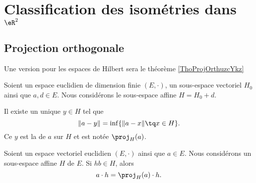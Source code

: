 
\section{Classification des isométries dans \( \eR^2\)}

\subsection{Projection orthogonale}

Une version pour les espaces de Hilbert sera le théorème \ref{ThoProjOrthuzcYkz}
\begin{propositionDef}      \label{DEFooHXJTooNPyDFQ}
    Soient un espace euclidien de dimension finie \( (E,\cdot)\), un sous-espace vectoriel \( H_0\) ainsi que \( a,d\in E\). Nous considérons le sous-espace affine \( H=H_0+d\).

    Il existe un unique \( y\in H\) tel que
    \begin{equation}
        \| a-y  \|=\inf\{ \| a-x \|\tq x\in H \}.
    \end{equation}
    Ce \( y\) est la  de \( a\) sur \( H\) et est notée \( \proj_H(a)\).
\end{propositionDef}

\begin{lemma}       \label{LEMooXZMFooOPTjNx}
    Soient un espace vectoriel euclidien \( (E,\cdot)\) ainsi que \( a\in E\). Nous considérons un sous-espace affine \( H\) de \( E\). Si \(hb\in H\), alors
    \begin{equation}
        a\cdot h=\proj_H(a)\cdot h.
    \end{equation}
\end{lemma}

